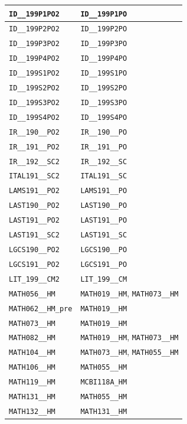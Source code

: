 \begin{longtable}{|p{4.4in}|p{4.4in}|}
    \verb|ID__199P1PO2| & \verb|ID__199P1PO|\\\hline
    \verb|ID__199P2PO2| & \verb|ID__199P2PO|\\\hline
    \verb|ID__199P3PO2| & \verb|ID__199P3PO|\\\hline
    \verb|ID__199P4PO2| & \verb|ID__199P4PO|\\\hline
    \verb|ID__199S1PO2| & \verb|ID__199S1PO|\\\hline
    \verb|ID__199S2PO2| & \verb|ID__199S2PO|\\\hline
    \verb|ID__199S3PO2| & \verb|ID__199S3PO|\\\hline
    \verb|ID__199S4PO2| & \verb|ID__199S4PO|\\\hline
    \verb|IR__190__PO2| & \verb|IR__190__PO|\\\hline
    \verb|IR__191__PO2| & \verb|IR__191__PO|\\\hline
    \verb|IR__192__SC2| & \verb|IR__192__SC|\\\hline
    \verb|ITAL191__SC2| & \verb|ITAL191__SC|\\\hline
    \verb|LAMS191__PO2| & \verb|LAMS191__PO|\\\hline
    \verb|LAST190__PO2| & \verb|LAST190__PO|\\\hline
    \verb|LAST191__PO2| & \verb|LAST191__PO|\\\hline
    \verb|LAST191__SC2| & \verb|LAST191__SC|\\\hline
    \verb|LGCS190__PO2| & \verb|LGCS190__PO|\\\hline
    \verb|LGCS191__PO2| & \verb|LGCS191__PO|\\\hline
    \verb|LIT_199__CM2| & \verb|LIT_199__CM|\\\hline
    \verb|MATH056__HM| & \verb|MATH019__HM|, \verb|MATH073__HM|\\\hline
    \verb|MATH062__HM_pre| & \verb|MATH019__HM|\\\hline
    \verb|MATH073__HM| & \verb|MATH019__HM|\\\hline
    \verb|MATH082__HM| & \verb|MATH019__HM|, \verb|MATH073__HM|\\\hline
    \verb|MATH104__HM| & \verb|MATH073__HM|, \verb|MATH055__HM|\\\hline
    \verb|MATH106__HM| & \verb|MATH055__HM|\\\hline
    \verb|MATH119__HM| & \verb|MCBI118A_HM|\\\hline
    \verb|MATH131__HM| & \verb|MATH055__HM|\\\hline
    \verb|MATH132__HM| & \verb|MATH131__HM|\\\hline

\end{longtable}
